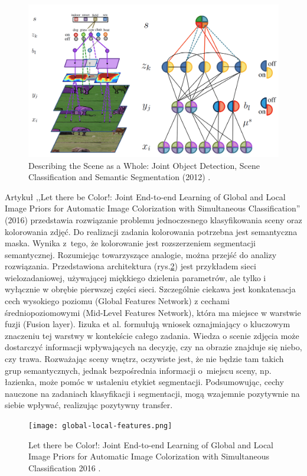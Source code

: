 \begin{figure}[ht!]
    \includegraphics[width=\textwidth]{img/joint-segmentation-and-classification.png}
    \caption{Describing the Scene as a Whole: Joint Object Detection, Scene Classification and Semantic Segmentation (2012) \cite{yao2012describing}.}
    \label{fig:scene-as-a-whole}
\end{figure}
\vspace{0.5cm}
Artykuł ,,Let there be Color!: Joint End-to-end Learning of Global and Local Image Priors for Automatic Image Colorization with Simultaneous Classification'' (2016) \cite{iizuka2016let} przedstawia rozwiązanie problemu jednoczesnego klasyfikowania sceny oraz kolorowania zdjęć. Do realizacji zadania kolorowania potrzebna jest semantyczna maska. Wynika z~tego, że kolorowanie jest rozszerzeniem segmentacji semantycznej. Rozumiejąc towarzyszące analogie, można przejść do analizy rozwiązania. Przedstawiona architektura (rys.\ref{fig:parrarel-arch}) jest przykładem sieci wielozadaniowej, używającej miękkiego dzielenia parametrów, ale tylko i wyłącznie w obrębie pierwszej części sieci. Szczególnie ciekawa jest konkatenacja cech wysokiego poziomu (Global Features Network) z cechami średniopoziomowymi (Mid-Level Features Network), która ma miejsce w warstwie fuzji (Fusion layer). Iizuka et al. formułują wniosek oznajmiający o kluczowym znaczeniu tej warstwy w kontekście całego zadania. Wiedza o scenie zdjęcia może dostarczyć informacji wpływających na decyzję, czy na obrazie znajduje się niebo, czy trawa. Rozważając sceny wnętrz, oczywiste jest, że nie będzie tam takich grup semantycznych, jednak bezpośrednia informacji o~miejscu sceny, np. łazienka, może pomóc w ustaleniu etykiet segmentacji. Podsumowując, cechy nauczone na zadaniach klasyfikacji i segmentacji, mogą wzajemnie pozytywnie na siebie wpływać, realizując pozytywny transfer.
\begin{figure}[ht!]
    \texttt{[image: global-local-features.png]}
    \caption{Let there be Color!: Joint End-to-end Learning of Global and Local Image Priors for Automatic Image Colorization with Simultaneous Classification 2016 \cite{iizuka2016let}.}
    \label{fig:parrarel-arch}
\end{figure}


